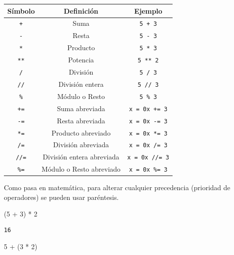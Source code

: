 \documentclass[
  letterpaper,
  DIV=11,
  numbers=noendperiod]{scrreprt}
\newenvironment{Shaded}{\begin{snugshade}}{\end{snugshade}}
\newcommand{\DecValTok}[1]{\textcolor[rgb]{0.68,0.00,0.00}{#1}}
\newcommand{\NormalTok}[1]{\textcolor[rgb]{0.00,0.23,0.31}{#1}}
\newcommand{\OperatorTok}[1]{\textcolor[rgb]{0.37,0.37,0.37}{#1}}
\begin{document}
\begin{longtable}[]{@{}ccc@{}}
\toprule\noalign{}
Símbolo & Definición & Ejemplo \\
\midrule\noalign{}
\endhead
\bottomrule\noalign{}
\endlastfoot
\texttt{+} & Suma & \texttt{5\ +\ 3} \\
\texttt{-} & Resta & \texttt{5\ -\ 3} \\
\texttt{*} & Producto & \texttt{5\ *\ 3} \\
\texttt{**} & Potencia & \texttt{5\ **\ 2} \\
\texttt{/} & División & \texttt{5\ /\ 3} \\
\texttt{//} & División entera & \texttt{5\ //\ 3} \\
\texttt{\%} & Módulo o Resto & \texttt{5\ \%\ 3} \\
\texttt{+=} & Suma abreviada & \texttt{x\ =\ 0}\texttt{x\ +=\ 3} \\
\texttt{-=} & Resta abreviada & \texttt{x\ =\ 0}\texttt{x\ -=\ 3} \\
\texttt{*=} & Producto abreviado & \texttt{x\ =\ 0}\texttt{x\ *=\ 3} \\
\texttt{/=} & División abreviada & \texttt{x\ =\ 0}\texttt{x\ /=\ 3} \\
\texttt{//=} & División entera abreviada &
\texttt{x\ =\ 0}\texttt{x\ //=\ 3} \\
\texttt{\%=} & Módulo o Resto abreviado &
\texttt{x\ =\ 0}\texttt{x\ \%=\ 3} \\
\end{longtable}

Como pasa en matemática, para alterar cualquier precedencia (prioridad
de operadores) se pueden usar paréntesis.

\begin{Shaded}
\begin{Highlighting}[]
\NormalTok{(}\DecValTok{5} \OperatorTok{+} \DecValTok{3}\NormalTok{) }\OperatorTok{*} \DecValTok{2}
\end{Highlighting}
\end{Shaded}

\begin{verbatim}
16
\end{verbatim}

\begin{Shaded}
\begin{Highlighting}[]
\DecValTok{5} \OperatorTok{+}\NormalTok{ (}\DecValTok{3} \OperatorTok{*} \DecValTok{2}\NormalTok{)}
\end{Highlighting}
\end{Shaded}
\end{document}
